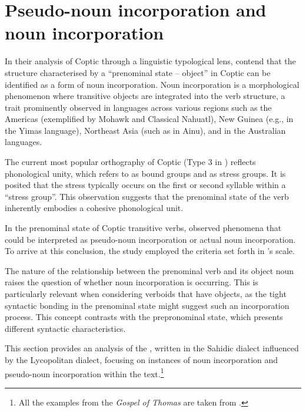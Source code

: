 \documentclass[output=paper,colorlinks,citecolor=brown ,chinesefont]{langscibook}
\begin{document}
\section{Pseudo-noun incorporation and noun incorporation}

In their analysis of Coptic through a linguistic typological lens, \citet{grossmaniemmolo} contend that the structure characterised by a “prenominal state -- object” in Coptic can be identified as a form of noun incorporation. Noun incorporation is a morphological phenomenon where transitive objects are integrated into the verb structure, a trait prominently observed in languages across various regions such as the Americas (exemplified by Mohawk and Classical Nahuatl), New Guinea (e.g., in the Yimas language), Northeast Asia (such as in Ainu), and in the Australian languages.

The current most popular orthography of Coptic (Type 3 in ) reflects phonological unity, which \citet{layton1} refers to as bound groups and \citet{haspelmath} as stress groups. It is posited that the stress typically occurs on the first or second syllable within a “stress group”. This observation suggests that the prenominal state of the verb inherently embodies a cohesive phonological unit.

In the prenominal state of Coptic transitive verbs, \citet{miyagawa2} observed phenomena that could be interpreted as pseudo-noun incorporation or actual noun incorporation. To arrive at this conclusion, the study employed the criteria set forth in \citet{mithun}’s scale.

The nature of the relationship between the prenominal verb and its object noun raises the question of whether noun incorporation is occurring. This is particularly relevant when considering verboids that have objects, as the tight syntactic bonding in the prenominal state might suggest such an incorporation process. This concept contrasts with the prepronominal state, which presents different syntactic characteristics.

This section provides an analysis of the ,  written in the Sahidic dialect influenced by the Lycopolitan dialect, focusing on instances of noun incorporation and pseudo-noun incorporation within the text.\footnote{All the examples from the \textit{Gospel of Thomas} are taken from \citet{layton2}.}
\end{document}
